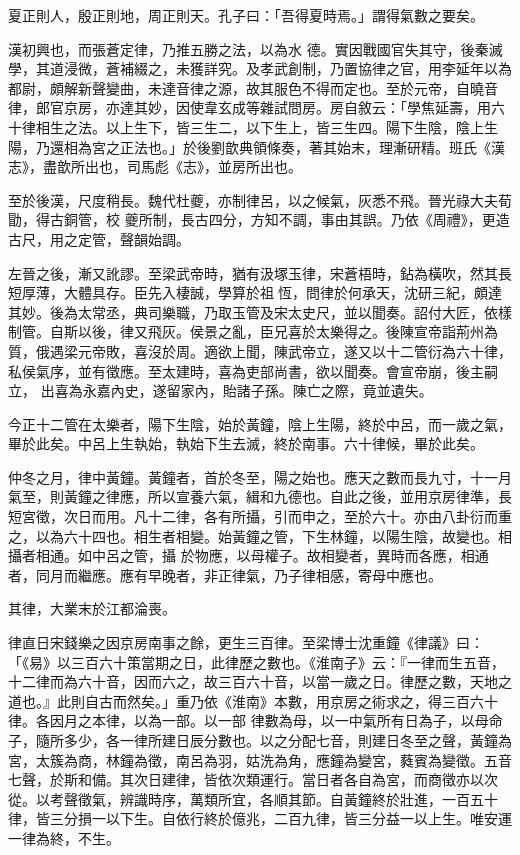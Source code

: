 \begin{pinyinscope}
 夏正則人，殷正則地，周正則天。孔子曰：「吾得夏時焉。」謂得氣數之要矣。



 漢初興也，而張蒼定律，乃推五勝之法，以為水
 德。實因戰國官失其守，後秦滅學，其道浸微，蒼補綴之，未獲詳究。及孝武創制，乃置協律之官，用李延年以為都尉，頗解新聲變曲，未達音律之源，故其服色不得而定也。至於元帝，自曉音律，郎官京房，亦達其妙，因使韋玄成等雜試問房。房自敘云：「學焦延壽，用六十律相生之法。以上生下，皆三生二，以下生上，皆三生四。陽下生陰，陰上生陽，乃還相為宮之正法也。」於後劉歆典領條奏，著其始末，理漸研精。班氏《漢志》，盡歆所出也，司馬彪《志》，並房所出也。



 至於後漢，尺度稍長。魏代杜夔，亦制律呂，以之候氣，灰悉不飛。晉光祿大夫荀勖，得古銅管，校
 夔所制，長古四分，方知不調，事由其誤。乃依《周禮》，更造古尺，用之定管，聲韻始調。



 左晉之後，漸又訛謬。至梁武帝時，猶有汲塚玉律，宋蒼梧時，鉆為橫吹，然其長短厚薄，大體具存。臣先入棲誠，學算於祖恆，問律於何承天，沈研三紀，頗達其妙。後為太常丞，典司樂職，乃取玉管及宋太史尺，並以聞奏。詔付大匠，依樣制管。自斯以後，律又飛灰。侯景之亂，臣兄喜於太樂得之。後陳宣帝詣荊州為質，俄遇梁元帝敗，喜沒於周。適欲上聞，陳武帝立，遂又以十二管衍為六十律，私侯氣序，並有徵應。至太建時，喜為吏部尚書，欲以聞奏。會宣帝崩，後主嗣立，
 出喜為永嘉內史，遂留家內，貽諸子孫。陳亡之際，竟並遺失。



 今正十二管在太樂者，陽下生陰，始於黃鐘，陰上生陽，終於中呂，而一歲之氣，畢於此矣。中呂上生執始，執始下生去滅，終於南事。六十律候，畢於此矣。



 仲冬之月，律中黃鐘。黃鐘者，首於冬至，陽之始也。應天之數而長九寸，十一月氣至，則黃鐘之律應，所以宣養六氣，緝和九德也。自此之後，並用京房律準，長短宮徵，次日而用。凡十二律，各有所攝，引而申之，至於六十。亦由八卦衍而重之，以為六十四也。相生者相變。始黃鐘之管，下生林鐘，以陽生陰，故變也。相攝者相通。如中呂之管，攝
 於物應，以母權子。故相變者，異時而各應，相通者，同月而繼應。應有早晚者，非正律氣，乃子律相感，寄母中應也。



 其律，大業末於江都淪喪。



 律直日宋錢樂之因京房南事之餘，更生三百律。至梁博士沈重鐘《律議》曰：「《易》以三百六十策當期之日，此律歷之數也。《淮南子》云：『一律而生五音，十二律而為六十音，因而六之，故三百六十音，以當一歲之日。律歷之數，天地之道也。』此則自古而然矣。」重乃依《淮南》本數，用京房之術求之，得三百六十律。各因月之本律，以為一部。以一部
 律數為母，以一中氣所有日為子，以母命子，隨所多少，各一律所建日辰分數也。以之分配七音，則建日冬至之聲，黃鐘為宮，太簇為商，林鐘為徵，南呂為羽，姑洗為角，應鐘為變宮，蕤賓為變徵。五音七聲，於斯和備。其次日建律，皆依次類運行。當日者各自為宮，而商徵亦以次從。以考聲徵氣，辨識時序，萬類所宜，各順其節。自黃鐘終於壯進，一百五十律，皆三分損一以下生。自依行終於億兆，二百九律，皆三分益一以上生。唯安運一律為終，不生。




\end{pinyinscope}
